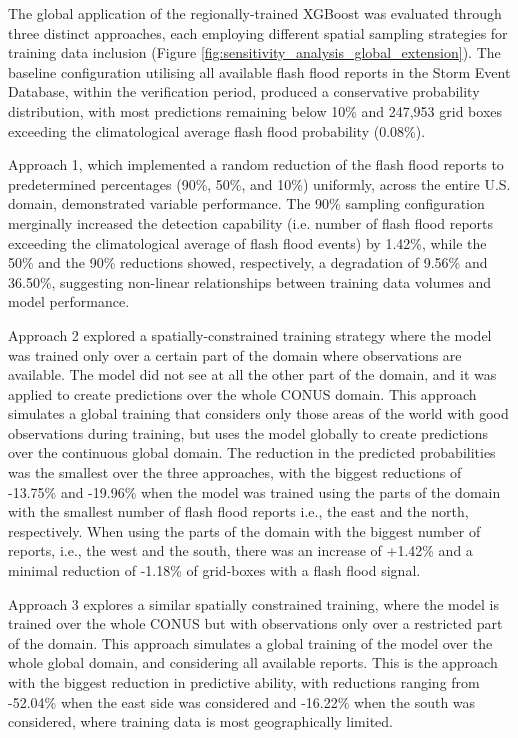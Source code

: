 The global application of the regionally-trained XGBoost was evaluated through three distinct approaches, each employing different spatial sampling strategies for training data inclusion (Figure \ref{fig:sensitivity_analysis_global_extension}). The baseline configuration utilising all available flash flood reports in the Storm Event Database, within the verification period, produced a conservative probability distribution, with most predictions remaining below 10\% and 247,953 grid boxes exceeding the climatological average flash flood probability (0.08\%).

Approach 1, which implemented a random reduction of the flash flood reports to predetermined percentages (90\%, 50\%, and 10\%) uniformly, across the entire U.S. domain, demonstrated variable performance. The 90\% sampling configuration merginally increased the detection capability (i.e. number of flash flood reports exceeding the climatological average of flash flood events) by 1.42\%, while the 50\% and the 90\% reductions showed, respectively, a degradation of 9.56\% and 36.50\%, suggesting non-linear relationships between training data volumes and model performance.

Approach 2 explored a spatially-constrained training strategy where the model was trained only over a certain part of the domain where observations are available. The model did not see at all the other part of the domain, and it was applied to create predictions over the whole CONUS domain. This approach simulates a global training that considers only those areas of the world with good observations during training, but uses the model globally to create predictions over the continuous global domain. The reduction in the predicted probabilities was the smallest over the three approaches, with the biggest  reductions of -13.75\% and -19.96\% when the model was trained using the parts of the domain with the smallest number of flash flood reports i.e., the east and the north, respectively. When using the parts of the domain with the biggest number of reports, i.e., the west and the south, there was an increase of +1.42\% and a minimal reduction of -1.18\% of grid-boxes with a flash flood signal.

Approach 3 explores a similar spatially constrained training, where the model is trained over the whole CONUS but with observations only over a restricted part of the domain. This approach simulates a global training of the model over the whole global domain, and considering all available reports. This is the approach with the biggest reduction in predictive ability, with reductions ranging from -52.04\% when the east side was considered and -16.22\% when the south was considered, where training data is most geographically limited.

